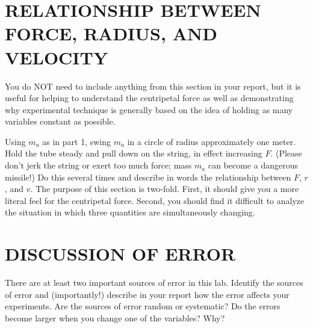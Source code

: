 \documentclass[11pt,letterpaper]{article}
\newcounter{question}[section]
\begin{document}
\section{RELATIONSHIP BETWEEN FORCE, RADIUS, AND VELOCITY}
You do NOT need to include anything from this section in your report, but it is useful for helping to understand the centripetal force as well as demonstrating why experimental technique is generally based on the idea of holding as many variables constant as possible.

Using $m_a$ as in part 1, swing $m_a$ in a circle of radius approximately one
meter.  Hold the tube steady and pull down on the string, in
effect increasing $F$.  (Please don't jerk the string or exert too
much force; mass $m_a$ can become a dangerous missile!)  Do this several times
and describe in words the relationship between $F$, $r$, and $v$.  The
purpose of this section is two-fold.  First, it should give you a more literal feel for the centripetal force. Second, you should find it difficult to analyze the situation in which three quantities are simultaneously changing. %

\section{DISCUSSION OF ERROR}
There are at least two important sources of error in this lab. Identify the sources of error and (importantly!) describe in your report how the error affects your experiments. Are the sources of error random or systematic? Do the errors become larger when you change one of the variables? Why? 




\end{document}
